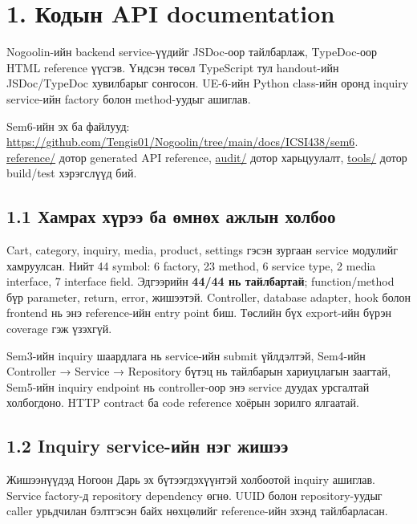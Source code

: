 \documentclass[
  mongolian,
]{article}
\author{}
\date{}
\begin{document}


\section{1. Кодын API
documentation}\label{ux43aux43eux434ux44bux43d-api-documentation}

Nogoolin-ийн backend service-үүдийг JSDoc-оор тайлбарлаж, TypeDoc-оор
HTML reference үүсгэв. Үндсэн төсөл TypeScript тул handout-ийн
JSDoc/TypeDoc хувилбарыг сонгосон. UE-6-ийн Python class-ийн оронд
inquiry service-ийн factory болон method-уудыг ашиглав.

Sem6-ийн эх ба файлууд:
\url{https://github.com/Tengis01/Nogoolin/tree/main/docs/ICSI438/sem6}.
\href{reference/index.html}{reference/} дотор generated API reference,
\href{audit/provenance.md}{audit/} дотор харьцуулалт,
\href{tools/package.json}{tools/} дотор build/test хэрэгслүүд бий.

\subsection{1.1 Хамрах хүрээ ба өмнөх ажлын
холбоо}\label{ux445ux430ux43cux440ux430ux445-ux445ux4afux440ux44dux44d-ux431ux430-ux4e9ux43cux43dux4e9ux445-ux430ux436ux43bux44bux43d-ux445ux43eux43bux431ux43eux43e}

Cart, category, inquiry, media, product, settings гэсэн зургаан service
модулийг хамруулсан. Нийт 44 symbol: 6 factory, 23 method, 6 service
type, 2 media interface, 7 interface field. Эдгээрийн \textbf{44/44 нь
тайлбартай}; function/method бүр parameter, return, error, жишээтэй.
Controller, database adapter, hook болон frontend нь энэ reference-ийн
entry point биш. Төслийн бүх export-ийн бүрэн coverage гэж үзэхгүй.

Sem3-ийн inquiry шаардлага нь service-ийн submit үйлдэлтэй, Sem4-ийн
Controller → Service → Repository бүтэц нь тайлбарын хариуцлагын
заагтай, Sem5-ийн inquiry endpoint нь controller-оор энэ service дуудах
урсгалтай холбогдоно. HTTP contract ба code reference хоёрын зорилго
ялгаатай.

\subsection{1.2 Inquiry service-ийн нэг
жишээ}\label{inquiry-service-ux438ux439ux43d-ux43dux44dux433-ux436ux438ux448ux44dux44d}

Жишээнүүдэд Ногоон Дарь эх бүтээгдэхүүнтэй холбоотой inquiry ашиглав.
Service factory-д repository dependency өгнө. UUID болон
repository-уудыг caller урьдчилан бэлтгэсэн байх нөхцөлийг reference-ийн
эхэнд тайлбарласан.
\end{document}
